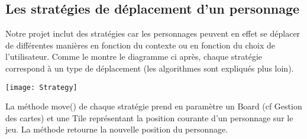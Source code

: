 \subsection{Les stratégies de déplacement d'un personnage}

Notre projet inclut des stratégies car les personnages peuvent en effet se déplacer de différentes manières en fonction du contexte ou en fonction du choix de l'utilisateur. Comme le montre le diagramme ci après, chaque stratégie correspond à un type de déplacement (les algorithmes sont expliqués plus loin). \\[0.5cm]

\centerline{\texttt{[image: Strategy]}}

La méthode move() de chaque stratégie prend en paramètre un Board (cf Gestion des cartes) et une Tile représentant la position courante d'un personnage sur le jeu. La méthode retourne la nouvelle position du personnage.
